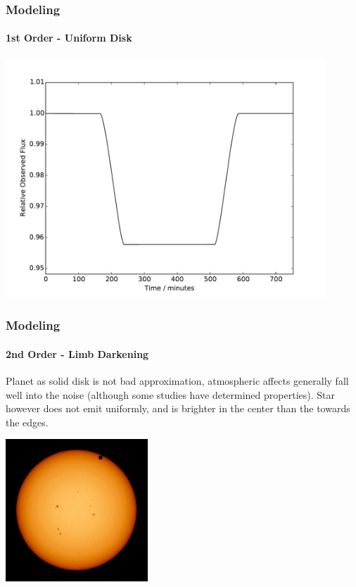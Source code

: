 \documentclass{beamer}
\begin{document}
  \begin{frame}
  \frametitle{Modeling}
    \framesubtitle{1st Order - Uniform Disk}
    \begin{center}
    \includegraphics[width=0.9\textwidth]{images/uniform_disk_model.pdf}
    \end{center}
  \end{frame}
  \begin{frame}
  \frametitle{Modeling}
    \framesubtitle{2nd Order - Limb Darkening}
    Planet as solid disk is not bad approximation, atmospheric affects generally fall well into the noise (although some studies have determined properties).
    Star however does not emit uniformly, and is brighter in the center than the towards the edges.
    \begin{center}
    \includegraphics[width=0.4\textwidth]{images/venus_transit.jpg}
    \end{center}
  \end{frame}
\end{document}
